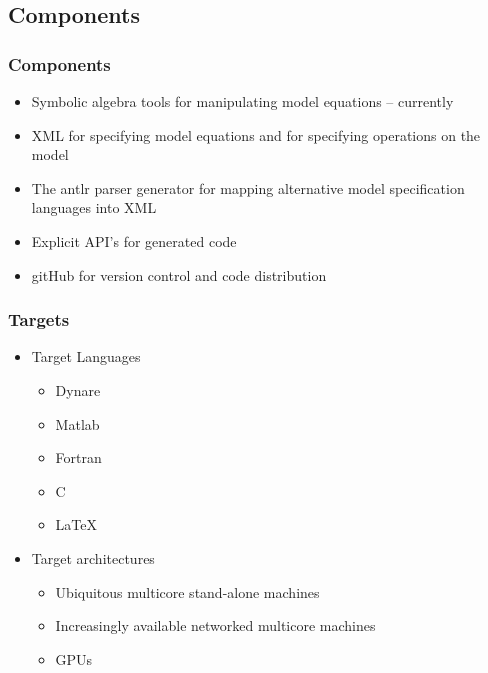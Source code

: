 \documentclass{beamer}
\begin{document}
\subsection{Components}
\begin{frame}
  \frametitle{Components}  

{\small
  \begin{itemize}
\item Symbolic algebra tools for manipulating model equations
 -- currently \mma 
\item XML for specifying model equations and 
for specifying operations on the model
\item The antlr parser generator for mapping alternative 
model specification languages into  XML
\item Explicit  API's for generated code
\item gitHub for version control and code distribution
  \end{itemize}

}
\end{frame}

\begin{frame}
  \frametitle{Targets}
  
  \begin{itemize}
\item Target Languages
    \begin{itemize}
    \item Dynare
    \item Matlab
    \item Fortran
    \item C
    \item \LaTeX
    \end{itemize}
\item Target architectures
  \begin{itemize}
\item Ubiquitous multicore stand-alone machines
  \item Increasingly available networked multicore machines
  \item GPUs
  \end{itemize}

  \end{itemize}
\end{frame}

\end{document}
